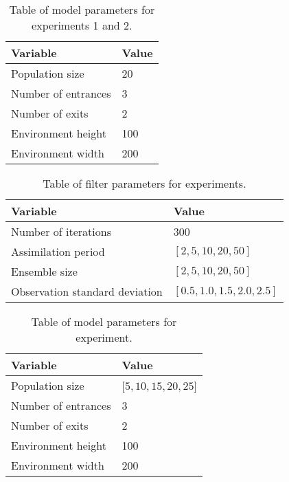 \begin{table}[h]
    \centering
    \begin{tabular}{@{}ll@{}}
    \toprule
        Variable            & Value                 \\ \midrule
        Population size     & 20                    \\
        Number of entrances & 3                     \\
        Number of exits     & 2                     \\
        Environment height  & 100                   \\
        Environment width   & 200                   \\ \bottomrule
    \end{tabular}
    \caption{Table of model parameters for experiments
    1 and 2.}\label{tab:model_params_12}
\end{table}

\begin{table}[h]
    \centering
    \begin{tabular}{@{}ll@{}}
        \toprule
        Variable                       & Value                         \\ \midrule
        Number of iterations           & 300                           \\
        Assimilation period            & $[2, 5, 10, 20, 50]$          \\
        Ensemble size                  & $[2, 5, 10, 20, 50]$          \\
        Observation standard deviation & $[0.5, 1.0, 1.5, 2.0, 2.5]$   \\ \bottomrule
    \end{tabular}
    \caption{Table of filter parameters for experiments.}\label{tab:filter_params}
\end{table}

\begin{table}[h]
    \centering
    \begin{tabular}{@{}ll@{}}
    \toprule
        Variable            & Value                 \\ \midrule
        Population size     & $[5, 10, 15, 20, 25$] \\
        Number of entrances & 3                     \\
        Number of exits     & 2                     \\
        Environment height  & 100                   \\
        Environment width   & 200                   \\ \bottomrule
    \end{tabular}
    \caption{Table of model parameters for experiment.}\label{tab:model_params}
\end{table}

